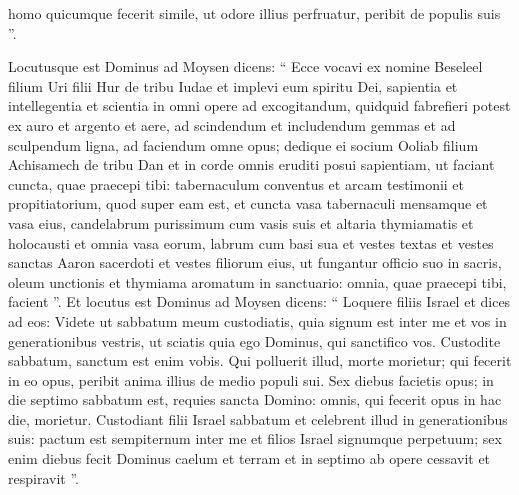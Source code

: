\begin{biblechapter}
\begin{biblechapter}
\begin{biblechapter}
\begin{biblechapter}
\begin{biblechapter}
\begin{biblechapter}
\begin{biblechapter}
\begin{biblechapter}
\begin{biblechapter}
\begin{biblechapter}
\begin{biblechapter}
\begin{biblechapter}
\begin{biblechapter}
\begin{biblechapter}
\begin{biblechapter}
\begin{biblechapter}
\begin{biblechapter}
\begin{biblechapter}
\begin{biblechapter}
\begin{biblechapter}
\begin{biblechapter}
\begin{biblechapter}
\begin{biblechapter}
\begin{biblechapter}
\begin{biblechapter}
\begin{biblechapter}
\begin{biblechapter}
\begin{biblechapter}
\begin{biblechapter}
\begin{biblechapter}
\verse homo quicumque fecerit simile, ut odore illius perfruatur, peribit de populis suis ”.
 
\begin{biblechapter}
\verse Locutusque est Dominus ad Moysen dicens: 
\verse “ Ecce vocavi ex nomine Beseleel filium Uri filii Hur de tribu Iudae 
\verse et implevi eum spiritu Dei, sapientia et intellegentia et scientia in omni opere 
\verse ad excogitandum, quidquid fabrefieri potest ex auro et argento et aere, 
\verse ad scindendum et includendum gemmas et ad sculpendum ligna, ad faciendum omne opus; 
\verse dedique ei socium Ooliab filium Achisamech de tribu Dan et in corde omnis eruditi posui sapientiam, ut faciant cuncta, quae praecepi tibi: 
\verse tabernaculum conventus et arcam testimonii et propitiatorium, quod super eam est, et cuncta vasa tabernaculi 
\verse mensamque et vasa eius, candelabrum purissimum cum vasis suis et altaria thymiamatis 
\verse et holocausti et omnia vasa eorum, labrum cum basi sua 
\verse et vestes textas et vestes sanctas Aaron sacerdoti et vestes filiorum eius, ut fungantur officio suo in sacris, 
\verse oleum unctionis et thymiama aromatum in sanctuario: omnia, quae praecepi tibi, facient ”.
 \verse Et locutus est Dominus ad Moysen dicens: 
\verse “ Loquere filiis Israel et dices ad eos: Videte ut sabbatum meum custodiatis, quia signum est inter me et vos in generationibus vestris, ut sciatis quia ego Dominus, qui sanctifico vos. 
\verse Custodite sabbatum, sanctum est enim vobis. Qui polluerit illud, morte morietur; qui fecerit in eo opus, peribit anima illius de medio populi sui. 
 \verse Sex diebus facietis opus; in die septimo sabbatum est, requies sancta Domino: omnis, qui fecerit opus in hac die, morietur. 
\verse Custodiant filii Israel sabbatum et celebrent illud in generationibus suis: pactum est sempiternum 
 \verse inter me et filios Israel signumque perpetuum; sex enim diebus fecit Dominus caelum et terram et in septimo ab opere cessavit et respiravit ”.

\end{biblechapter}
\end{biblechapter}
\end{biblechapter}
\end{biblechapter}
\end{biblechapter}
\end{biblechapter}
\end{biblechapter}
\end{biblechapter}
\end{biblechapter}
\end{biblechapter}
\end{biblechapter}
\end{biblechapter}
\end{biblechapter}
\end{biblechapter}
\end{biblechapter}
\end{biblechapter}
\end{biblechapter}
\end{biblechapter}
\end{biblechapter}
\end{biblechapter}
\end{biblechapter}
\end{biblechapter}
\end{biblechapter}
\end{biblechapter}
\end{biblechapter}
\end{biblechapter}
\end{biblechapter}
\end{biblechapter}
\end{biblechapter}
\end{biblechapter}
\end{biblechapter}
